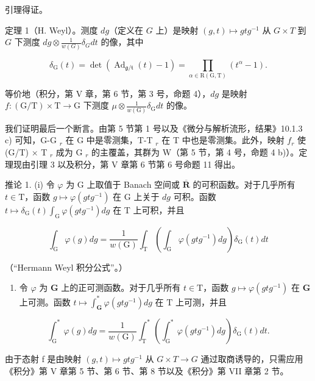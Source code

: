 引理得证。

定理 1（H. Weyl）。测度 \(dg\)（定义在 \(G\) 上）是映射 \((g, t) \mapsto gtg^{-1}\) 从 \(G \times T\) 到 \(G\) 下测度 \(dg \otimes \frac{1}{w(G)}\delta_G dt\) 的像，其中

\[
\delta_ {\mathrm{G}} (t) = \det (\operatorname{Ad} _ {\mathfrak {g} / \mathfrak {t}} (t) - 1) = \prod_ {\alpha \in \mathrm{R} (\mathrm{G}, \mathrm{T})} (t ^ {\alpha} - 1).
\]

等价地（积分，第 V 章，第 6 节，第 3 号，命题 4），\(dg\) 是映射 \(f: (\mathrm{G} / \mathrm{T}) \times \mathrm{T} \to \mathrm{G}\) 下测度 \(\mu \otimes \frac{1}{w(\mathrm{G})}\delta_{\mathrm{G}}dt\) 的像。

我们证明最后一个断言。由第 5 节第 1 号以及《微分与解析流形，结果》10.1.3 c) 可知，G-G \(_{r}\) 在 G 中是零测集，T-T \(_{r}\) 在 T 中也是零测集。此外，映射 \(f_{r}\) 使 (G/T) × T \(_{r}\) 成为 G \(_{r}\) 的主覆盖，其群为 W（第 5 节，第 4 号，命题 4 b)）。定理现由引理 3 以及积分，第 V 章第 6 节第 6 号命题 11 得出。

推论 1. (i) 令 \(\varphi\) 为 G 上取值于 Banach 空间或 \(\overline{\mathbf{R}}\) 的可积函数。对于几乎所有 \(t \in \mathrm{T}\)，函数 \(g \mapsto \varphi(gtg^{-1})\) 在 G 上关于 \(dg\) 可积。函数 \(t \mapsto \delta_{\mathrm{G}}(t) \int_{\mathrm{G}} \varphi(gtg^{-1}) dg\) 在 T 上可积，并且

\[
\int_ {\mathrm{G}} \varphi (g) d g = \frac {1}{w (\mathrm{G})} \int_ {\mathrm{T}} \left(\int_ {\mathrm{G}} \varphi (g t g ^ {- 1}) d g\right) \delta_ {\mathrm{G}} (t) d t\tag{4}
\]

（“Hermann Weyl 积分公式”。）

\begin{enumerate}
\def\labelenumi{(\roman{enumi})}
\setcounter{enumi}{1}
\tightlist
\item
  令 \(\varphi\) 为 \(\mathbf{G}\) 上的正可测函数。对于几乎所有 \(t \in \mathrm{T}\)，函数 \(g \mapsto \varphi(gtg^{-1})\) 在 \(\mathbf{G}\) 上可测。函数 \(t \mapsto \int_{\mathbf{G}}^{*} \varphi(gtg^{-1}) dg\) 在 \(\mathrm{T}\) 上可测，并且
\end{enumerate}

\[
\int_ {\mathrm{G}} ^ {*} \varphi (g) d g = \frac {1}{w (\mathrm{G})} \int_ {\mathrm{T}} ^ {*} \left(\int_ {\mathrm{G}} ^ {*} \varphi (g t g ^ {- 1}) d g\right) \delta_ {\mathrm{G}} (t) d t.\tag{5}
\]

由于态射 f 是由映射 \((g, t) \mapsto gtg^{-1}\) 从 \(G \times T \to G\) 通过取商诱导的，只需应用《积分》第 V 章第 5 节、第 6 节、第 8 节以及《积分》第 VII 章第 2 节。

